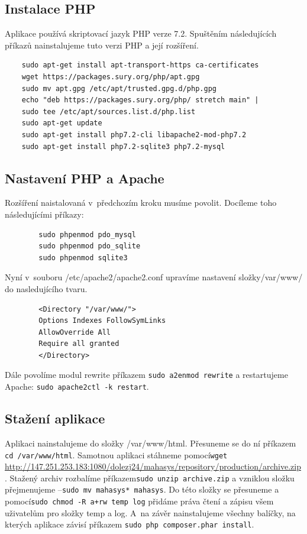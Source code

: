 \documentclass[thesis=B,czech]{FITthesis}[2012/06/26]
\begin{document}
\subsection{Instalace PHP}
	Aplikace používá skriptovací jazyk PHP verze 7.2. Spuštěním následujících příkazů nainstalujeme tuto verzi PHP a její rozšíření.
	\begin{verbatim}
	sudo apt-get install apt-transport-https ca-certificates
	wget https://packages.sury.org/php/apt.gpg
	sudo mv apt.gpg /etc/apt/trusted.gpg.d/php.gpg 
	echo "deb https://packages.sury.org/php/ stretch main" | 
	sudo tee /etc/apt/sources.list.d/php.list
	sudo apt-get update
	sudo apt-get install php7.2-cli libapache2-mod-php7.2
	sudo apt-get install php7.2-sqlite3 php7.2-mysql
	\end{verbatim}
\subsection{Nastavení PHP a Apache}
	Rozšíření naistalovaná v~předchozím kroku musíme povolit. Docíleme toho následujícími příkazy:
	\begin{verbatim}
		sudo phpenmod pdo_mysql
		sudo phpenmod pdo_sqlite
		sudo phpenmod sqlite3
	\end{verbatim}
	Nyní v~souboru /etc/apache2/apache2.conf upravíme nastavení složky\newline/var/www/ do nasledujícího tvaru.
	\begin{verbatim}
		<Directory "/var/www/">
		Options Indexes FollowSymLinks
		AllowOverride All
		Require all granted
		</Directory>
	\end{verbatim}
	Dále povolíme modul rewrite příkazem \verb|sudo a2enmod rewrite| a restartujeme Apache: \verb|sudo apache2ctl -k restart|.
\subsection{Stažení aplikace}
	Aplikaci nainstalujeme do složky /var/www/html. Přesuneme se do ní příkazem \verb|cd /var/www/html|. Samotnou aplikaci stáhneme pomocí\newline\verb|wget | \url{http://147.251.253.183:1080/dolezj24/mahasys/repository/production/archive.zip}. Stažený archiv rozbalíme příkazem\newline\verb|sudo unzip archive.zip| a vzniklou složku přejmenujeme --\newline\verb|sudo mv mahasys* mahasys|. Do této složky se přesuneme a pomocí\newline\verb|sudo chmod -R a+rw temp log| přidáme práva čtení a zápisu všem uživatelům pro složky temp a log. A~na závěr nainstalujeme všechny balíčky, na kterých aplikace závisí příkazem \verb|sudo php composer.phar install|.
\end{document}

